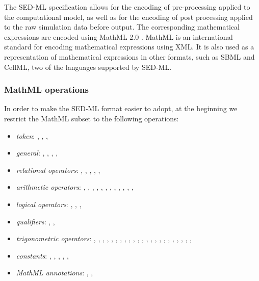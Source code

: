 \label{sec:mathML}
The SED-ML specification allows for the encoding of pre-processing applied to the computational model,  as well as for the encoding of post processing applied to the raw simulation data before output. 
The corresponding mathematical expressions are encoded using MathML 2.0 \citep{CIM+01}. MathML is an international standard for encoding mathematical expressions using XML. It is also used as a representation of mathematical expressions in other formats, such as SBML and CellML, two of the languages supported by SED-ML. 

\subsubsection{MathML operations}
In order to make the SED-ML format easier to adopt, at the beginning we restrict the MathML subset to the following operations: 

\begin{itemize}\setlength{\parskip}{-0.1ex}

\item \emph{token}: , , ,
  
\item \emph{general}: , ,
  , ,  

\item \emph{relational operators}: , ,
  , , , 

\item \emph{arithmetic operators}: , ,
  , , , ,
  , , , ,
  , , 

\item \emph{logical operators}: , ,
  , 

\item \emph{qualifiers}: , ,

\item \emph{trigonometric operators}: , ,
  , , , ,
  , , , ,
  , , , ,
  , , , ,
  , , ,
  , , 

\item \emph{constants}: , ,
  , , ,

\item \emph{MathML annotations}: ,
  , 
\end{itemize}

